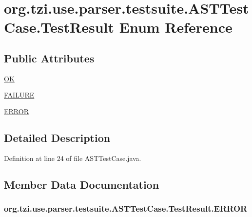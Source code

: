 \hypertarget{enumorg_1_1tzi_1_1use_1_1parser_1_1testsuite_1_1_a_s_t_test_case_1_1_test_result}{\section{org.\-tzi.\-use.\-parser.\-testsuite.\-A\-S\-T\-Test\-Case.\-Test\-Result Enum Reference}
\label{enumorg_1_1tzi_1_1use_1_1parser_1_1testsuite_1_1_a_s_t_test_case_1_1_test_result}
}
\subsection*{Public Attributes}
\begin{DoxyCompactItemize}
\item 
\hyperlink{enumorg_1_1tzi_1_1use_1_1parser_1_1testsuite_1_1_a_s_t_test_case_1_1_test_result_a2ef0c3f8667fb610ed48e7955663069a}{O\-K}
\item 
\hyperlink{enumorg_1_1tzi_1_1use_1_1parser_1_1testsuite_1_1_a_s_t_test_case_1_1_test_result_a8f890ef6428dd20d724fb084b8dde4b8}{F\-A\-I\-L\-U\-R\-E}
\item 
\hyperlink{enumorg_1_1tzi_1_1use_1_1parser_1_1testsuite_1_1_a_s_t_test_case_1_1_test_result_a0ecc35d68e2c3e54eecac64eb1d639ea}{E\-R\-R\-O\-R}
\end{DoxyCompactItemize}


\subsection{Detailed Description}


Definition at line 24 of file A\-S\-T\-Test\-Case.\-java.



\subsection{Member Data Documentation}
\hypertarget{enumorg_1_1tzi_1_1use_1_1parser_1_1testsuite_1_1_a_s_t_test_case_1_1_test_result_a0ecc35d68e2c3e54eecac64eb1d639ea}{
\subsubsection[{E\-R\-R\-O\-R}]{\setlength{\rightskip}{0pt plus 5cm}org.\-tzi.\-use.\-parser.\-testsuite.\-A\-S\-T\-Test\-Case.\-Test\-Result.\-E\-R\-R\-O\-R}}\label{enumorg_1_1tzi_1_1use_1_1parser_1_1testsuite_1_1_a_s_t_test_case_1_1_test_result_a0ecc35d68e2c3e54eecac64eb1d639ea}


